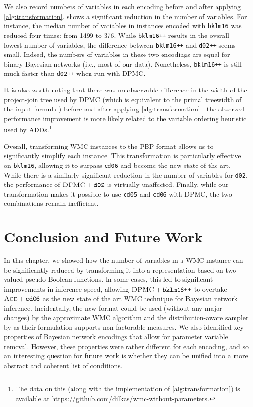 We also record numbers of variables in each encoding before and after applying
\cref{alg:transformation}.  shows a significant reduction in the
number of variables. For instance, the median number of variables in instances
encoded with \texttt{bklm16} was reduced four times: from 1499 to 376. While
\texttt{bklm16++} results in the overall lowest number of variables, the
difference between \texttt{bklm16++} and \texttt{d02++} seems small. Indeed, the
numbers of variables in these two encodings are equal for binary Bayesian
networks (i.e., most of our data). Nonetheless, \texttt{bklm16++} is still much
faster than \texttt{d02++} when run with \textsc{DPMC}.

It is also worth noting that there was no observable difference in the width of
the project-join tree used by \textsc{DPMC} (which is equivalent to the primal
treewidth of the input formula \citep{DBLP:conf/cp/DudekPV20}) before and after
applying \cref{alg:transformation}---the observed performance improvement is
more likely related to the variable ordering heuristic used by
ADDs.\footnote{The data on this (along with the implementation of
  \cref{alg:transformation}) is available at
  \url{https://github.com/dilkas/wmc-without-parameters}.}

Overall, transforming WMC instances to the PBP format allows us to significantly
simplify each instance. This transformation is particularly effective on
\texttt{bklm16}, allowing it to surpass \texttt{cd06} and become the new state
of the art. While there is a similarly significant reduction in the number of
variables for \texttt{d02}, the performance of $\textsc{DPMC}+\texttt{d02}$ is
virtually unaffected. Finally, while our transformation makes it possible to use
\texttt{cd05} and \texttt{cd06} with \textsc{DPMC}, the two combinations remain
inefficient.

\section{Conclusion and Future Work}

In this chapter, we showed how the number of variables in a WMC instance can be
significantly reduced by transforming it into a representation based on
two-valued pseudo-Boolean functions. In some cases, this led to significant
improvements in inference speed, allowing $\textsc{DPMC} + \texttt{bklm16++}$ to
overtake $\textsc{Ace}+\texttt{cd06}$ as the new state of the art WMC technique
for Bayesian network inference. Incidentally, the new format could be used
(without any major changes) by the approximate WMC algorithm and the
distribution-aware sampler by \citet{DBLP:conf/aaai/ChakrabortyFMSV14} as their
formulation supports non-factorable measures. We also identified key properties
of Bayesian network encodings that allow for parameter variable removal.
However, these properties were rather different for each encoding, and so an
interesting question for future work is whether they can be unified into a more
abstract and coherent list of conditions.

